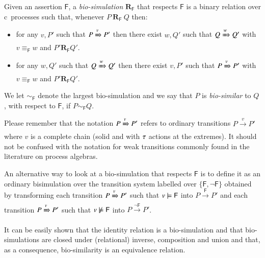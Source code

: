 \begin{definition}
Given an assertion $\mathsf{F}$, a \emph{bio-simulation} $\mathbf{R}_{\mathsf{F}}$ that respects $\mathsf{F}$ is a binary relation over c\CNA \  processes such that, whenever $P~\mathrel{\mathbf{R}_{\mathsf{F}}}~Q$ then:
 \begin{itemize} 
 \item
 for any $v,P'$ such that 
 $P \xRightarrow{v} P'$ then there exist $w,Q'$ such that $Q  \xRightarrow{w} Q'$ with $v\equiv_{\mathsf{F}} w$ and $P' \mathrel{\mathbf{R}_{\mathsf{F}}} Q'$.
\item
 for any $w,Q'$ such that 
 $Q \xRightarrow{w} Q'$ then there exist $v,P'$ such that $P  \xRightarrow{v} P'$ with $v\equiv_{\mathsf{F}} w$ and $P' \mathrel{\mathbf{R}_{\mathsf{F}}} Q'$.
\end{itemize}
We let $ \sim_{\mathsf{F}} $ denote the largest  bio-simulation and we say that $P$ is \emph{bio-similar} to $Q$, with respect to $\mathsf{F}$, if $P \sim_{\mathsf{F}} Q$.
\end{definition}

\begin{remark}
Please remember that the notation $P \xRightarrow{v} P'$ refers to ordinary transitions $P \xrightarrow{v} P'$ where $v$ is a complete chain (solid and with $\tau$ actions at the extremes).
It should not be confused with the notation for weak transitions commonly found in the literature on process algebras.
\end{remark}

\begin{remark}
An alternative way to look at a bio-simulation that respects $\mathsf{F}$ is to define it as an ordinary bisimulation over the transition system labelled over $\{\mathsf{F},\neg \mathsf{F}\}$ obtained by transforming each transition $P \xRightarrow{v} P'$ such that $v\models \mathsf{F}$ into $P \xrightarrow{\mathsf{F}} P'$ and  each transition $P \xRightarrow{v} P'$ such that $v\not\models \mathsf{F}$ into $P \xrightarrow{\neg \mathsf{F}} P'$.
\end{remark}

It can be easily shown that the identity relation is a bio-simulation and that bio-simulations are closed under (relational) inverse, composition and union and that, as a consequence, bio-similarity is an equivalence relation.


